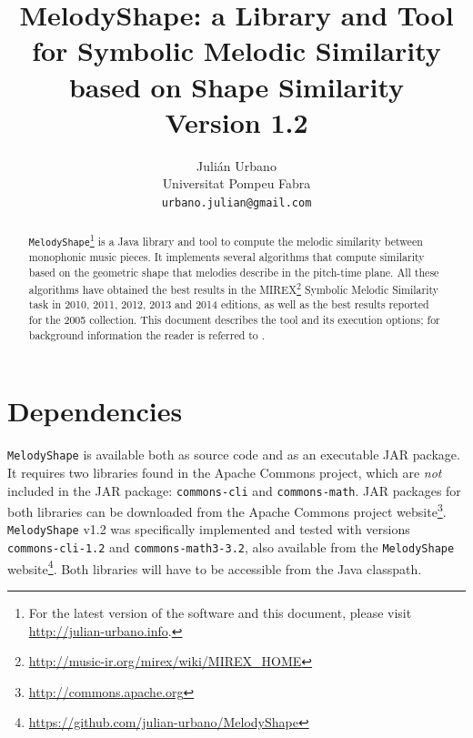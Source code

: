 \documentclass[twoside]{article}
\begin{document}
\title{\textbf{MelodyShape: a Library and Tool for Symbolic Melodic Similarity based on Shape Similarity\\{\Large Version 1.2}}}
\author{Juli\'an Urbano\\Universitat Pompeu Fabra\\\texttt{urbano.julian@gmail.com}}
\maketitle

\sloppy 

\begin{abstract}
\noindent\texttt{MelodyShape}\footnote{For the latest version of the software and this document, please visit \url{http://julian-urbano.info}.} is a Java library and tool to compute the melodic similarity between monophonic music pieces. It implements several algorithms that compute similarity based on the geometric shape that melodies describe in the pitch-time plane. All these algorithms have obtained the best results in the MIREX\footnote{\url{http://music-ir.org/mirex/wiki/MIREX_HOME}} Symbolic Melodic Similarity task in 2010, 2011, 2012, 2013 and 2014 editions, as well as the best results reported for the 2005 collection. This document describes the tool and its execution options; for background information the reader is referred to \cite{Urbano2011:shape}.
\end{abstract}

\section{Dependencies}

\texttt{MelodyShape} is available both as source code and as an executable JAR package. It requires two libraries found in the Apache Commons project, which are \emph{not} included in the JAR package: \texttt{commons-cli} and \texttt{commons-math}.
JAR packages for both libraries can be downloaded from the Apache Commons project website\footnote{\url{http://commons.apache.org}}. \texttt{MelodyShape} v1.2 was specifically implemented and tested with versions \texttt{commons-cli-1.2} and \texttt{commons-math3-3.2}, also available from the \texttt{MelodyShape} website\footnote{\url{https://github.com/julian-urbano/MelodyShape}}.
Both libraries will have to be accessible from the Java classpath.
\end{document}
